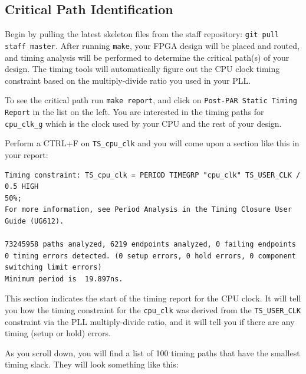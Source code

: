 \documentclass[11pt]{article}
\begin{document}
\subsection{Critical Path Identification}
Begin by pulling the latest skeleton files from the staff repository: \verb|git pull staff master|. After running \verb|make|, your FPGA design will be placed and routed, and timing analysis will be performed to determine the critical path(s) of your design. The timing tools will automatically figure out the CPU clock timing constraint based on the multiply-divide ratio you used in your PLL. 

To see the critical path run \verb|make report|, and click on \verb|Post-PAR Static Timing Report| in the list on the left. You are interested in the timing paths for \verb|cpu_clk_g| which is the clock used by your CPU and the rest of your design.

Perform a CTRL+F on \verb|TS_cpu_clk| and you will come upon a section like this in your report:

\begin{verbatim}
Timing constraint: TS_cpu_clk = PERIOD TIMEGRP "cpu_clk" TS_USER_CLK / 0.5 HIGH 
50%;
For more information, see Period Analysis in the Timing Closure User Guide (UG612).

73245958 paths analyzed, 6219 endpoints analyzed, 0 failing endpoints
0 timing errors detected. (0 setup errors, 0 hold errors, 0 component switching limit errors)
Minimum period is  19.897ns.
\end{verbatim}

This section indicates the start of the timing report for the CPU clock. It will tell you how the timing constraint for the \verb|cpu_clk| was derived from the \verb|TS_USER_CLK| constraint via the PLL multiply-divide ratio, and it will tell you if there are any timing (setup or hold) errors.

As you scroll down, you will find a list of 100 timing paths that have the smallest timing slack. They will look something like this:
\end{document}
